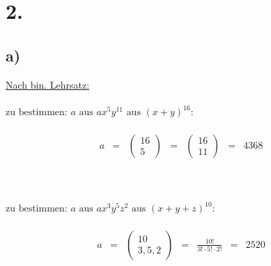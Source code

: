 \documentclass[a4paper]{scrartcl}
\begin{document}
\newpage
\section{2.}
	\subsection{a)}
		\underline{Nach bin. Lehrsatz:} \\ \\
		\(\text{zu bestimmen: }a\text{ aus }ax^5y^{11}\text{ aus }(x+y)^{16}: \)\\ \\
		\[
		\begin{array}{rclclcl}
		 	a&=&
		 	\begin{pmatrix}
		 		16 \\
		 		5
		 	\end{pmatrix}
		 	&=&
		 	\begin{pmatrix}
		 		16 \\
		 		11
		 	\end{pmatrix}
		 	&=&4368
		\end{array}
		\]
		\\ \\ \\
		\(\text{zu bestimmen: }a\text{ aus }ax^3y^5z^2\text{ aus }(x+y+z)^{10}: \)\\ \\
		\[
		\begin{array}{rclclcl}
		a&=&
		\begin{pmatrix}
			10 \\
			3,5,2
		\end{pmatrix}
		&=&\frac{10!}{3!\cdot 5!\cdot 2!}
		&=&2520
		\end{array}
		\]
	
\end{document}
